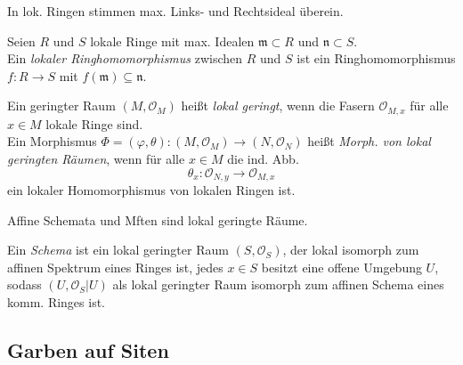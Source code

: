 \documentclass{cheat-sheet}
\renewcommand{\O}{\mathcal{O}} %
\begin{document}
\begin{bem}
  In lok. Ringen stimmen max. Links- und Rechtsideal überein.
\end{bem}

\begin{defn}
  Seien $R$ und $S$ lokale Ringe mit max. Idealen $\mathfrak{m} \!\subset\! R$ und $\mathfrak{n} \!\subset\! S$. \\
  Ein \emph{lokaler Ringhomomorphismus} zwischen $R$ und $S$ ist ein Ringhomomorphismus $f : R \to S$ mit $f(\mathfrak{m}) \subseteq \mathfrak{n}$.
\end{defn}

\begin{defn}
  Ein geringter Raum $(M, \O_M)$ heißt \emph{lokal geringt}, wenn die Fasern $\O_{M,x}$ für alle $x \in M$ lokale Ringe sind. \\
  Ein Morphismus $\Phi = (\varphi, \theta) \!:\! (M, \O_M) \to (N, \O_N)$ heißt \emph{Morph. von lokal geringten Räumen}, wenn für alle $x \in M$ die ind. Abb.
  \[ \theta_x : \O_{N,y} \to \O_{M,x} \]
  ein lokaler Homomorphismus von lokalen Ringen ist.
\end{defn}

\begin{bspe}
  Affine Schemata und Mften sind lokal geringte Räume.
\end{bspe}


\begin{defn}
  Ein \emph{Schema} ist ein lokal geringter Raum $(S, \O_S)$, der lokal isomorph zum affinen Spektrum eines Ringes ist, \dh{} jedes $x \in S$ besitzt eine offene Umgebung $U$, sodass $(U, \O_S|U)$ als lokal geringter Raum isomorph zum affinen Schema eines komm. Ringes ist.
\end{defn}




\begin{samepage}

\subsection{Garben auf Siten}

\end{samepage}
\end{document}

